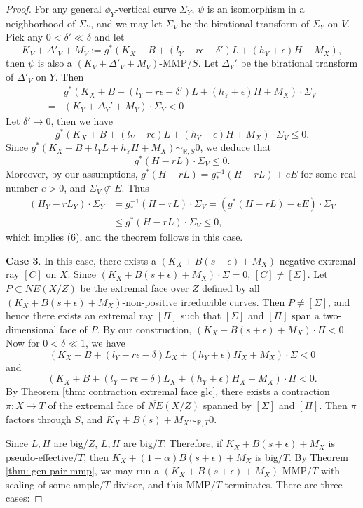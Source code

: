 \documentclass[11pt]{amsart}
\numberwithin{equation}{section}
\newcommand{\Rr}{\mathbb{R}}
\theoremstyle{definition}
\theoremstyle{definition}
\theoremstyle{definition}
\begin{document}
\begin{proof}
For any general $\phi_Y$-vertical curve $\Sigma_Y$, $\psi$ is an isomorphism in a neighborhood of $\Sigma_Y$, and we may let $\Sigma_V$ be the birational transform of $\Sigma_Y$ on $V$. Pick any $0<\delta'\ll\delta$ and let
$$K_V+\Delta'_V+M_V:=g^*(K_X+B+(l_Y-r\epsilon-\delta')L+(h_Y+\epsilon)H+M_X),$$
then $\psi$ is also a $(K_V+\Delta'_V+M_V)$-MMP$/S$. Let $\Delta_Y'$ be the birational transform of $\Delta'_V$ on $Y$. Then
\begin{align*}
&g^*(K_X+B+(l_Y-r\epsilon-\delta')L+(h_Y+\epsilon)H+M_X)\cdot\Sigma_V\\
=&(K_Y+\Delta_Y'+M_Y)\cdot\Sigma_Y<0
\end{align*}
Let $\delta'\rightarrow 0$, then we have
$$g^*(K_X+B+(l_Y-r\epsilon)L+(h_Y+\epsilon)H+M_X)\cdot\Sigma_V\leq 0.$$
Since $g^*(K_X+B+l_YL+h_YH+M_X)\sim_{\mathbb R,S}0$, we deduce that
$$g^*(H-rL)\cdot\Sigma_V\leq 0.$$
Moreover, by our assumptions, $g^*(H-rL)=g^{-1}_*(H-rL)+eE$ for some real number $e>0$, and $\Sigma_V\not\subset E$. Thus
\begin{align*}
    (H_Y-rL_Y)\cdot\Sigma_Y&=g^{-1}_*(H-rL)\cdot\Sigma_V=(g^*(H-rL)-eE)\cdot\Sigma_V\\
    &\leq g^*(H-rL)\cdot\Sigma_V\leq 0,
\end{align*}
which implies (6), and the theorem follows in this case.

\medskip

\noindent\textbf{Case 3}. In this case, there exists a $(K_X+B(s+\epsilon)+M_X)$-negative extremal ray $[C]$ on $X$. Since $(K_X+B(s+\epsilon)+M_X)\cdot\Sigma=0$, $[C]\not=[\Sigma]$. Let $P\subset\overline{NE}(X/Z)$ be the extremal face over $Z$ defined by all $(K_X+B(s+\epsilon)+M_X)$-non-positive irreducible curves. Then $P\not=[\Sigma]$, and hence there exists an extremal ray $[\Pi]$ such that $[\Sigma]$ and $[\Pi]$ span a two-dimensional face of $P$. By our construction, $(K_X+B(s+\epsilon)+M_X)\cdot\Pi<0$. Now for $0<\delta\ll 1$, we have
$$(K_X+B+(l_Y-r\epsilon-\delta)L_X+(h_Y+\epsilon)H_X+M_X)\cdot\Sigma<0$$
and
$$(K_X+B+(l_Y-r\epsilon-\delta)L_X+(h_Y+\epsilon)H_X+M_X)\cdot\Pi<0.$$
By Theorem \ref{thm: contraction extremal face glc}, there exists a contraction $\pi: X\rightarrow T$ of the extremal face of $\overline{NE}(X/Z)$ spanned by $[\Sigma]$ and $[\Pi]$. Then $\pi$ factors through $S$, and  $K_X+B(s)+M_X\sim_{\Rr,T}0$.

Since $L,H$ are big$/Z$, $L,H$ are big$/T$. Therefore, if $K_{X}+B(s+\epsilon)+M_X$ is pseudo-effective$/T$, then $K_X+(1+\alpha)B(s+\epsilon)+M_X$ is big$/T$. By Theorem \ref{thm: gen pair mmp}, we may run a $(K_{X}+B(s+\epsilon)+M_X)$-MMP$/T$ with scaling of some ample$/T$ divisor, and this MMP$/T$ terminates. There are three cases:


\end{proof}
\end{document}
